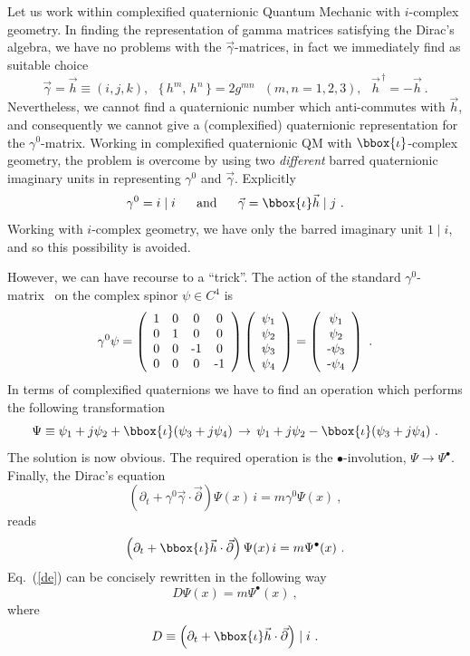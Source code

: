 Let us work within complexified quaternionic Quantum Mechanic with 
$i$-complex geometry.  In finding the representation of gamma matrices 
satisfying the Dirac's algebra, 
we have no problems with the $\vec{\gamma}$-matrices, in fact we immediately 
find as suitable choice
\[ \vec{\gamma} = \vec{h} \equiv (i,j,k),~~~
\{ \, h^m, \, h^n \, \} = 2 g^{mn}~~~(m,n=1,2,3),~~~
\vec{h}^{\, \dag} = - \vec{h}~.
\]
Nevertheless, we cannot find a quaternionic number which anti-commutes 
with $\vec{h}$, and consequently we cannot give a (complexified) quaternionic 
representation for the $\gamma^0$-matrix. Working in complexified 
quaternionic QM with $\bbox{\iota}$-complex geometry, the problem is overcome 
by using
two {\em different} barred quaternionic imaginary units in representing 
$\gamma^0$ and $\vec{\gamma}$. Explicitly
\[ 
\gamma^{0} = i\mid i ~~~~~\mbox{and}~~~~~
\vec{\gamma} = \bbox{\iota} \vec{h} \mid j~.
\]
Working with $i$-complex geometry,  we have only the barred imaginary 
unit $1\mid i$, and so this 
possibility is avoided.

However, we can have recourse to a ``trick''. The action of the 
standard $\gamma^0$-matrix~\cite{ZUB} 
on the complex spinor $\psi \in C^4$ is
\[ \gamma^0 \psi = \left( \begin{array}{cccc} 
1 & 0 & 0 & 0 \\
0 & 1 & 0 & 0 \\
0 & 0 & $-$1 & 0 \\
0 & 0 & 0 & $-$1 
   \end{array} \right) 
\left( \begin{array}{c} \psi_1\\ \psi_2 \\ \psi_3 \\ \psi_4
   \end{array} \right) =
\left( \begin{array}{c} \psi_1\\ \psi_2 \\ $-$\psi_3 \\ $-$\psi_4
   \end{array} \right) ~.
\]
In terms of complexified quaternions we have to find an operation which performs the following transformation
\[
\Psi \equiv \psi_1 + j \psi_2 + \bbox{\iota} (\psi_3 + j \psi_4)
\, \rightarrow \,  \psi_1 + j \psi_2 - \bbox{\iota} (\psi_3 + j \psi_4)~.
\]
The solution is now obvious. The required operation is the 
$\bullet$-involution,
$\Psi \rightarrow \Psi^{\bullet}$. Finally, the Dirac's equation 
\[ \left( \partial_t + \gamma^0 \vec{\gamma} \cdot \vec{\partial} \right)
\Psi (x) \, i
= m \gamma^0 \Psi(x)~,
\]
reads
\begin{equation}
\label{de}
\left( \partial_t  +\bbox{\iota} \vec{h} \cdot \vec{\partial} \right) \Psi(x)
\, i = m \Psi^{\bullet}(x)~.
\end{equation}
Eq.~(\ref{de}) can be concisely rewritten in the following way
\begin{equation}
\label{dec}
D \Psi(x)  = m \Psi^{\bullet}(x)~,
\end{equation}
where
\[ D \equiv \left( \partial_t  +\bbox{\iota} \vec{h} \cdot 
\vec{\partial} \right) \mid i ~.\]



